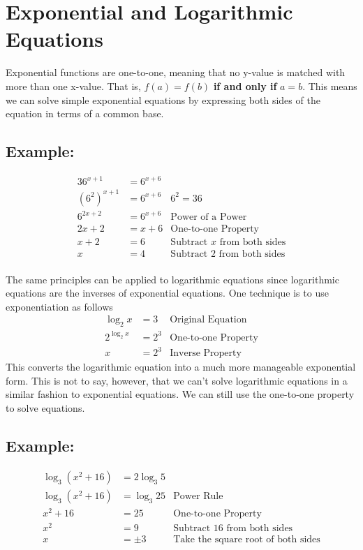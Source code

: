 \documentclass[11pt]{article}
\begin{document}
\section{Exponential and Logarithmic Equations}
Exponential functions are one-to-one, meaning that no y-value is matched with more than one x-value. That is, $f(a) = f(b)$ \textbf{if and only if} $a = b$. This means we can solve simple exponential equations by expressing both sides of the equation in terms of a common base. 

\subsection*{Example:}
\begin{align*}
    36^{x+1} &= 6^{x+6} & \\
    (6^{2})^{x+1} &= 6^{x+6} & 6^{2} = 36\\
    6^{2x+2} &= 6^{x+6} & \text{Power of a Power}\\
    2x + 2 &= x+6 & \text{One-to-one Property}\\
    x + 2 &= 6 & \text{Subtract $x$ from both sides}\\
    x &= 4 & \text{Subtract 2 from both sides}\\
\end{align*}

The same principles can be applied to logarithmic equations since logarithmic equations are the inverses of exponential equations. One technique is to use exponentiation as follows
\begin{align*}
    \log_{2}x &= 3 & \text{Original Equation}\\
    2^{\log_{2}x} &= 2^{3} & \text{One-to-one Property}\\
    x &= 2^{3} & \text{Inverse Property}
\end{align*}
This converts the logarithmic equation into a much more manageable exponential form. This is not to say, however, that we can't solve logarithmic equations in a similar fashion to exponential equations. We can still use the one-to-one property to solve equations.

\subsection*{Example:}
\begin{align*}
    \log_{3}(x^2 + 16) &= 2\log_{3}5 & \\
    \log_{3}(x^2 + 16) &= \log_{3}25 & \text{Power Rule}\\
    x^2 + 16 &= 25 & \text{One-to-one Property}\\
    x^2 &= 9 & \text{Subtract 16 from both sides}\\
    x &= \pm 3 & \text{Take the square root of both sides}\\
\end{align*}
\end{document}
